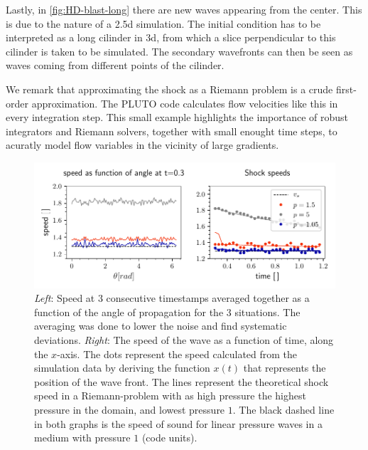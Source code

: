 Lastly, in \cref{fig:HD-blast-long} there are new waves appearing from the center. This is due to the nature of a 2.5d simulation.
The initial condition has to be interpreted as a long cilinder in 3d, from which a slice perpendicular to this cilinder is taken to be simulated. 
The secondary wavefronts can then be seen as waves coming from different points of the cilinder.

We remark that approximating the shock as a Riemann problem is a crude first-order approximation. 
The PLUTO code calculates flow velocities like this in every integration step. 
This small example highlights the importance of robust integrators and Riemann solvers, together with small enought time steps, to acuratly model flow variables in the vicinity of large gradients.

\begin{figure}[H]
	\centering
	\includegraphics[width=\linewidth]{images/HD-speed.pdf}
	\caption{\emph{Left}: Speed at 3 consecutive timestamps averaged together as a function of the angle of propagation for the 3 situations. 
		The averaging was done to lower the noise and find systematic deviations.
	\emph{Right}: The speed of the wave as a function of time, along the $x$-axis. 
	The dots represent the speed calculated from the simulation data by deriving the function $x(t)$ that represents the position of the wave front. 
	The lines represent the theoretical shock speed in a Riemann-problem with as high pressure the highest pressure in the domain, and lowest pressure $1$.
	The black dashed line in both graphs is the speed of sound for linear pressure waves in a medium with pressure $1$ (code units).}
	\label{fig:HD-speed}
\end{figure}

